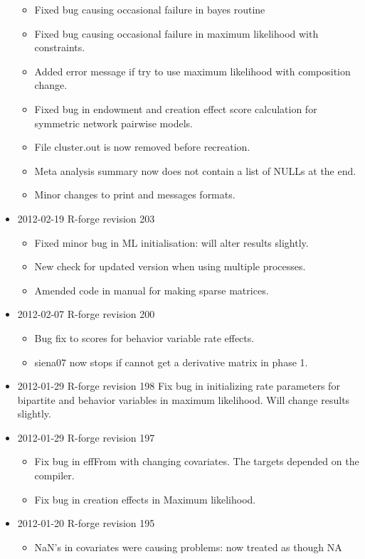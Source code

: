 \documentclass[a4paper,fleqn,11pt]{article}
\newcommand{\+}{\, + \,}
\begin{document}
\begin{small}
\begin{itemize}
\begin{itemize}
\item Fixed bug causing occasional failure in bayes routine
\item Fixed bug causing occasional failure in maximum likelihood with
  constraints.
\item Added error message if try to use maximum likelihood with composition
  change.
\item Fixed bug in endowment and creation effect score calculation for symmetric
  network pairwise models.
\item File cluster.out is now removed before recreation.
\item Meta analysis summary now does not contain a list of NULLs at the end.
\item Minor changes to print and messages formats.
\end{itemize}
\item 2012-02-19 R-forge revision 203
\begin{itemize}
\item Fixed minor bug in ML initialisation: will alter results slightly.
\item New check for updated version when using multiple processes.
\item Amended code in manual for making sparse matrices.
\end{itemize}
\item 2012-02-07 R-forge revision 200
\begin{itemize}
\item Bug fix to scores for behavior variable rate effects.
\item\textsf{siena07} now stops if cannot get a derivative matrix in phase 1.
\end{itemize}
\item 2012-01-29 R-forge revision 198
Fix bug in initializing rate parameters for bipartite and behavior variables in
maximum likelihood. Will change results slightly.
\item 2012-01-29 R-forge revision 197
\begin{itemize}
\item Fix bug in effFrom with changing covariates. The targets depended on the
compiler.
\item Fix bug in creation effects in Maximum likelihood.
\end{itemize}
\item 2012-01-20 R-forge revision 195
\begin{itemize}
\item NaN's in covariates were causing problems: now treated as though NA

\end{itemize}
\end{itemize}
\end{small}
\end{document}
